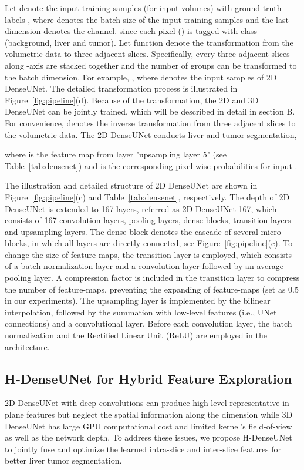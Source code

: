 \documentclass[journal]{IEEEtran}
\begin{document}
Let  denote the input training samples (for  input volumes) with ground-truth labels , where  denotes the batch size of the input training samples and the last dimension denotes the channel.  since each pixel () is tagged with class  (background, liver and tumor). Let function  denote the transformation from the volumetric data to three adjacent slices. Specifically, every three adjacent slices along -axis are stacked together and the number of groups can be transformed to the batch dimension.
For example, , where  denotes the input samples of 2D DenseUNet.
The detailed transformation process is illustrated in Figure~\ref{fig:pipeline}(d).
Because of the transformation, the 2D and 3D DenseUNet can be jointly trained, which will be described in detail in section B.
For convenience,   denotes the inverse transformation from three adjacent slices to the volumetric data.
The 2D DenseUNet conducts liver and tumor segmentation,

where  is the feature map from
layer "upsampling layer 5" (see Table~\ref{tab:densenet}) and  is the corresponding pixel-wise probabilities for input .

The illustration and detailed structure of 2D DenseUNet are shown in Figure~\ref{fig:pipeline}(c) and Table~\ref{tab:densenet}, respectively.
The depth of 2D DenseUNet is extended to 167 layers, referred as 2D DenseUNet-167, which consists of 167 convolution layers, pooling layers, dense blocks, transition layers and upsampling layers.
The dense block denotes the cascade of several micro-blocks, in which all layers are directly connected, see Figure~\ref{fig:pipeline}(c).
To change the size of feature-maps, the transition layer is employed, which consists of a batch normalization layer and a  convolution layer followed by an average pooling layer. A compression factor is included in the transition layer to compress the number of feature-maps, preventing the expanding of feature-maps (set as 0.5 in our experiments).
The upsampling layer is implemented by the bilinear interpolation, followed by the summation with low-level features (i.e., UNet connections) and a  convolutional layer.
Before each convolution layer, the batch normalization and the Rectified Linear Unit (ReLU) are employed in the architecture.

\subsection{H-DenseUNet for Hybrid Feature Exploration}
2D DenseUNet with deep convolutions can produce high-level representative in-plane features but neglect the spatial information along the  dimension while 3D DenseUNet has large GPU computational cost and limited kernel's field-of-view as well as the network depth.
To address these issues, we propose H-DenseUNet to jointly fuse and optimize the learned intra-slice and inter-slice features for better liver tumor segmentation.
\end{document}
